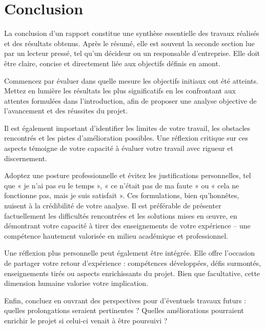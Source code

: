 \chapter{Conclusion}

La conclusion d'un rapport constitue une synthèse essentielle des travaux réalisés et des résultats obtenus. Après le résumé, elle est souvent la seconde section lue par un lecteur pressé, tel qu'un décideur ou un responsable d'entreprise. Elle doit être claire, concise et directement liée aux objectifs définis en amont.

Commencez par évaluer dans quelle mesure les objectifs initiaux ont été atteints. Mettez en lumière les résultats les plus significatifs en les confrontant aux attentes formulées dans l'introduction, afin de proposer une analyse objective de l'avancement et des réussites du projet.

Il est également important d'identifier les limites de votre travail, les obstacles rencontrés et les pistes d'amélioration possibles. Une réflexion critique sur ces aspects témoigne de votre capacité à évaluer votre travail avec rigueur et discernement.

Adoptez une posture professionnelle et évitez les justifications personnelles, tel que « je n'ai pas eu le temps », « ce n'était pas de ma faute » ou « cela ne fonctionne pas, mais je suis satisfait ». Ces formulations, bien qu'honnêtes, nuisent à la crédibilité de votre analyse. Il est préférable de présenter factuellement les difficultés rencontrées et les solutions mises en œuvre, en démontrant votre capacité à tirer des enseignements de votre expérience -- une compétence hautement valorisée en milieu académique et professionnel.

Une réflexion plus personnelle peut également être intégrée. Elle offre l'occasion de partager votre retour d'expérience : compétences développées, défis surmontés, enseignements tirés ou aspects enrichissants du projet. Bien que facultative, cette dimension humaine valorise votre implication.

Enfin, concluez en ouvrant des perspectives pour d'éventuels travaux futurs : quelles prolongations seraient pertinentes ? Quelles améliorations pourraient enrichir le projet si celui-ci venait à être poursuivi ?



\vfil
\hspace{8cm}\makeatletter\@author\makeatother\par
\hspace{8cm}\begin{minipage}{5cm}
    \printsignature
\end{minipage}